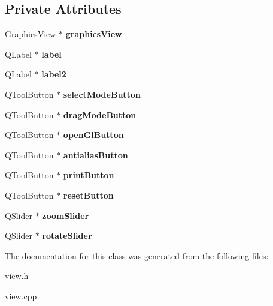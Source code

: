 \subsection*{Private Attributes}
\begin{DoxyCompactItemize}
\item 
\mbox{\label{class_view_abeaa234f089dcfe153fa8775879742b4}} 
\hyperlink{class_graphics_view}{Graphics\+View} $\ast$ {\bfseries graphics\+View}
\item 
\mbox{\label{class_view_a4828cf62e9dae5f323a07415e2085e93}} 
Q\+Label $\ast$ {\bfseries label}
\item 
\mbox{\label{class_view_a5d8e062d1c3d9976c5f2d3bfd7e14fc4}} 
Q\+Label $\ast$ {\bfseries label2}
\item 
\mbox{\label{class_view_a37dcb090da3612968a463fc1acdfdfd8}} 
Q\+Tool\+Button $\ast$ {\bfseries select\+Mode\+Button}
\item 
\mbox{\label{class_view_ab3e0064b1ee94740d1d842dbc7bd5b08}} 
Q\+Tool\+Button $\ast$ {\bfseries drag\+Mode\+Button}
\item 
\mbox{\label{class_view_a4c8297a419c25bb2e569fb2e8aea2e83}} 
Q\+Tool\+Button $\ast$ {\bfseries open\+Gl\+Button}
\item 
\mbox{\label{class_view_ad84d40cb5285bdaa915f54a019f989f8}} 
Q\+Tool\+Button $\ast$ {\bfseries antialias\+Button}
\item 
\mbox{\label{class_view_a661be086222b35b626c886d0daef0042}} 
Q\+Tool\+Button $\ast$ {\bfseries print\+Button}
\item 
\mbox{\label{class_view_ae69df47f5a15a623360aceab8ae532e9}} 
Q\+Tool\+Button $\ast$ {\bfseries reset\+Button}
\item 
\mbox{\label{class_view_a04e43e70df28e61b250272c08565622f}} 
Q\+Slider $\ast$ {\bfseries zoom\+Slider}
\item 
\mbox{\label{class_view_a15e93063689067dcf11aaa1813d020d6}} 
Q\+Slider $\ast$ {\bfseries rotate\+Slider}
\end{DoxyCompactItemize}


The documentation for this class was generated from the following files\+:\begin{DoxyCompactItemize}
\item 
view.\+h\item 
view.\+cpp\end{DoxyCompactItemize}
